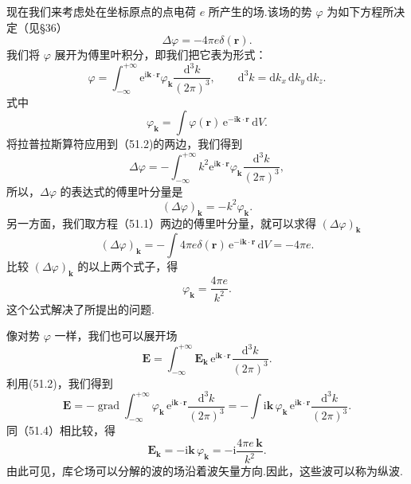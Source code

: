 现在我们来考虑处在坐标原点的点电荷 $e$ 所产生的场.该场的势 $\varphi$ 为如下方程所决定（见§36）
\begin{equation}
  \Delta\varphi=-4\pi e\delta(\boldsymbol{r}).
\end{equation}
我们将 $\varphi$ 展开为傅里叶积分，即我们把它表为形式：
\begin{equation}
  \varphi=\int_{-\infty}^{+\infty}\mathrm{e}^{\mathrm{i}\boldsymbol{k}\cdot\boldsymbol{r}}
  \varphi_{\boldsymbol{k}}\frac{\mathrm{d}^3k}{(2\pi)^3},\qquad
  \mathrm{d}^3k=\mathrm{d}k_x\,\mathrm{d}k_y\,\mathrm{d}k_z.
\end{equation}
式中
\begin{equation*}
  \varphi_{\boldsymbol{k}}=\int\varphi(\boldsymbol{r})
  \,\mathrm{e}^{-\mathrm{i}\boldsymbol{k}\cdot\boldsymbol{r}}\,\mathrm{d}V.
\end{equation*}
将拉普拉斯算符应用到（51.2)的两边，我们得到
\begin{equation*}
  \Delta\varphi=-\int_{-\infty}^{+\infty}k^2
  \mathrm{e}^{\mathrm{i}\boldsymbol{k}\cdot\boldsymbol{r}}
  \varphi_{\boldsymbol{k}}\frac{\mathrm{d}^3k}{(2\pi)^3},
\end{equation*}
所以，$\Delta\varphi$ 的表达式的傅里叶分量是
\begin{equation*}
  (\Delta\varphi)_{\boldsymbol{k}}=-k^2\varphi_{\boldsymbol{k}}.
\end{equation*}
另一方面，我们取方程（51.1）两边的傅里叶分量，就可以求得 $(\Delta\varphi)_{\boldsymbol{k}}$
\begin{equation*}
  (\Delta\varphi)_{\boldsymbol{k}}
  =-\int 4\pi e\delta(\boldsymbol{r})\,\mathrm{e}^{-\mathrm{i}\boldsymbol{k}\cdot\boldsymbol{r}}\,\mathrm{d}V
  =-4\pi e.
\end{equation*}
比较 $(\Delta\varphi)_{\boldsymbol{k}}$ 的以上两个式子，得
\begin{equation}
  \varphi_{\boldsymbol{k}}=\frac{4\pi e}{k^2}.
\end{equation}
这个公式解决了所提出的问题.

像对势 $\varphi$ 一样，我们也可以展开场
\begin{equation}
  \boldsymbol{E}=\int_{-\infty}^{+\infty}\boldsymbol{E}_{\boldsymbol{k}}
  \,\mathrm{e}^{\mathrm{i}\boldsymbol{k}\cdot\boldsymbol{r}}
  \frac{\mathrm{d}^3k}{(2\pi)^3}.
\end{equation}
利用(51.2)，我们得到
\begin{equation*}
  \boldsymbol{E}=-\operatorname{grad}\int_{-\infty}^{+\infty}
  \varphi_{\boldsymbol{k}}\,\mathrm{e}^{\mathrm{i}\boldsymbol{k}\cdot\boldsymbol{r}}
  \frac{\mathrm{d}^3k}{(2\pi)^3}
  =-\int\mathrm{i}\boldsymbol{k}\,\varphi_{\boldsymbol{k}}
  \,\mathrm{e}^{\mathrm{i}\boldsymbol{k}\cdot\boldsymbol{r}}
  \frac{\mathrm{d}^3k}{(2\pi)^3}.
\end{equation*}
同（51.4）相比较，得
\begin{equation}
  \boldsymbol{E}_{\boldsymbol{k}}=-\mathrm{i}\boldsymbol{k}\,\varphi_{\boldsymbol{k}}
  =-\mathrm{i}\frac{4\pi e\,\boldsymbol{k}}{k^2}.
\end{equation}
由此可见，库仑场可以分解的波的场沿着波矢量方向.因此，这些波可以称为纵波.

